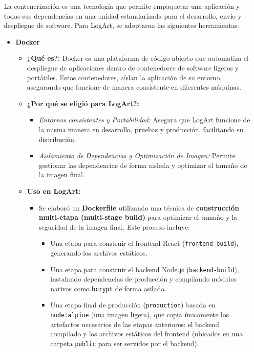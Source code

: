 La contenerización es una tecnología que permite empaquetar una aplicación y todas sus dependencias en una unidad estandarizada para el desarrollo, envío y despliegue de software. Para LogArt, se adoptaron las siguientes herramientas:

    \begin{itemize}
        \item \textbf{Docker}
            \begin{itemize}
                \item \textbf{¿Qué es?:} Docker es una plataforma de código abierto que automatiza el despliegue de aplicaciones dentro de contenedores de software ligeros y portátiles. Estos contenedores, aíslan la aplicación de su entorno, asegurando que funcione de manera consistente en diferentes máquinas.
                \item \textbf{¿Por qué se eligió para LogArt?:}
                    \begin{itemize}
                        \item \textit{Entornos consistentes y Portabilidad:} Asegura que LogArt funcione de la misma manera en desarrollo, pruebas y producción, facilitando su distribución.
                        \item \textit{Aislamiento de Dependencias y Optimización de Imagen:} Permite gestionar las dependencias de forma aislada y optimizar el tamaño de la imagen final.
                    \end{itemize}
                \item \textbf{Uso en LogArt:}
                    \begin{itemize}
                        \item Se elaboró un \textbf{Dockerfile} utilizando una técnica de \textbf{construcción multi-etapa (multi-stage build)} para optimizar el tamaño y la seguridad de la imagen final. Este proceso incluye:
                            \begin{itemize}
                                \item Una etapa para construir el frontend React (\texttt{frontend-build}), generando los archivos estáticos.
                                \item Una etapa para construir el backend Node.js (\texttt{backend-build}), instalando dependencias de producción y compilando módulos nativos como \texttt{bcrypt} de forma asilada.
                                \item Una etapa final de producción (\texttt{production}) basada en \texttt{node:alpine} (una imagen ligera), que copia únicamente los artefactos necesarios de las etapas anteriores: el backend compilado y los archivos estáticos del frontend (ubicados en una carpeta \texttt{public} para ser servidos por el backend).

\end{itemize}
\end{itemize}
\end{itemize}
\end{itemize}
